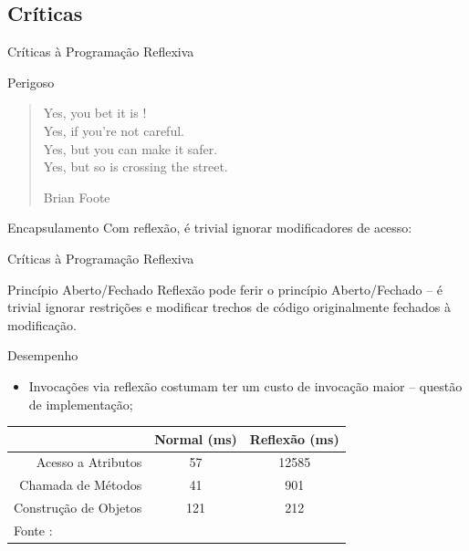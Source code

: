 \documentclass[12pt,t]{beamer}
\begin{document}
 	 \subsection{Críticas}
 	 \begin{frame}{Críticas à Programação Reflexiva}
 	 	\begin{block}{Perigoso}
 	 		\begin{quote}
 	 			Yes, you bet it is ! \\
 	 			Yes, if you're not careful. \\
 	 			Yes, but you can make it safer. \\
 	 			Yes, but so is crossing the street.
 	 			\begin{flushright}
 	 				Brian Foote
 	 			\end{flushright}
 	 		\end{quote}
 	 	\end{block}
 	 	\pause
 	 	\begin{block}{Encapsulamento}
 	 		Com reflexão, é trivial ignorar modificadores de acesso:
 	 		
 	 	\end{block}
 	 \end{frame}
	 \begin{frame}{Críticas à Programação Reflexiva}
 	 	\begin{block}{Princípio Aberto/Fechado}
 	 		Reflexão pode ferir o princípio Aberto/Fechado  	 	 \cite{meyer1988object} -- é trivial ignorar restrições e modificar trechos de código originalmente fechados à modificação.
 	 	\end{block}
 	 	\pause
 	 	\begin{block}{Desempenho}
 	 		\begin{itemize}
 	 			\item Invocações via reflexão costumam ter um custo de invocação maior -- \alert{questão de implementação};
 	 		\end{itemize}
 	 		\footnotesize
 	 			\begin{table}[h]
 	 				\begin{tabular}{rcc}
 	 					& Normal (ms)              & Reflexão (ms)            \\
 	 					\hline \hline
 	 					Acesso a Atributos    & 57                  & 12585                \\
 	 					Chamada de Métodos    & 41                  & 901                  \\
 	 					Construção de Objetos & 121                 & 212                  \\ \hline
 	 					\multicolumn{3}{l}{\footnotesize{Fonte : \citeonline{janPetedi2008Reflexive}}}
 	 				\end{tabular}
 	 			\end{table} 	 
 	 	\end{block}
 	 \end{frame}
\end{document}
